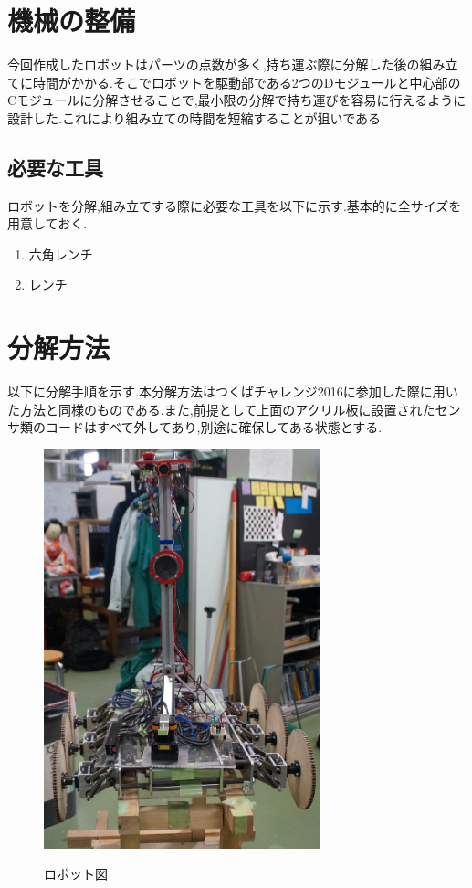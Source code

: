 \mc
\section{機械の整備}
今回作成したロボットはパーツの点数が多く,持ち運ぶ際に分解した後の組み立てに時間がかかる.そこでロボットを駆動部である2つのDモジュールと中心部のCモジュールに分解させることで,最小限の分解で持ち運びを容易に行えるように設計した.これにより組み立ての時間を短縮することが狙いである
\subsection{必要な工具}
ロボットを分解,組み立てする際に必要な工具を以下に示す.基本的に全サイズを用意しておく.
\begin{enumerate}
 \item 六角レンチ
 \item レンチ
\end{enumerate}

\section{分解方法}
以下に分解手順を示す.本分解方法はつくばチャレンジ2016に参加した際に用いた方法と同様のものである.また,前提として上面のアクリル板に設置されたセンサ類のコードはすべて外してあり,別途に確保してある状態とする.
\begin{figure}[htp]
 \begin{center}
  \includegraphics[width=80mm]{img/hard/f13.jpg}
 　\caption{ロボット図}
  \label{fig:robot}%
 \end{center}
\end{figure}

